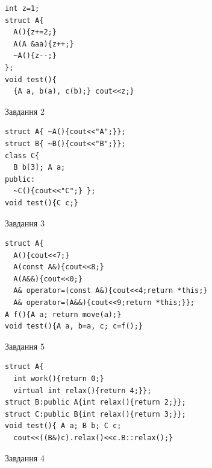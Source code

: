 \documentclass[12pt, ukrainian]{article}
\begin{document}
{{{{{{{\begin{minipage}[t]{11cm}
\begin{verbatim}
int z=1;
struct A{
  A(){z+=2;}
  A(A &aa){z++;}
  ~A(){z--;}
};
void test(){
  {A a, b(a), c(b);} cout<<z;}
\end{verbatim}            


               
{\begin{center}Завдання {2}\end{center}}
\vspace{-6mm}

\begin{verbatim}
struct A{ ~A(){cout<<"A";}};
struct B{ ~B(){cout<<"B";}};
class C{
  B b[3]; A a;
public:
  ~C(){cout<<"C";} };
void test(){C c;}
\end{verbatim}            


               
{\begin{center}Завдання {3}\end{center}}
\vspace{-6mm}

\begin{verbatim}
struct A{
  A(){cout<<7;}
  A(const A&){cout<<8;}
  A(A&&){cout<<0;}
  A& operator=(const A&){cout<<4;return *this;}
  A& operator=(A&&){cout<<9;return *this;}};
A f(){A a; return move(a);}
void test(){A a, b=a, c; c=f();}
\end{verbatim}            


               
{\begin{center}Завдання {5}\end{center}}
\vspace{-6mm}

\begin{verbatim}
struct A{
  int work(){return 0;}
  virtual int relax(){return 4;}};
struct B:public A{int relax(){return 2;}};
struct C:public B{int relax(){return 3;}};
void test(){ A a; B b; C c;
  cout<<((B&)c).relax()<<c.B::relax();}
\end{verbatim}            


\end{minipage}
\vline \hspace{8mm}
\begin{minipage}[t]{7cm}
               
{\begin{center}Завдання {4}\end{center}}
\vspace{-6mm}


\end{minipage}}}}}}}}
\end{document}

